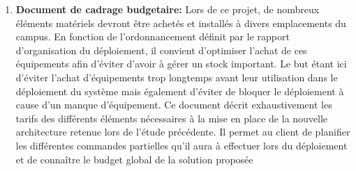 \begin{enumerate}
\item \textbf{Document de cadrage budgetaire:} Lors de ce projet, de nombreux éléments matériels devront être achetés et installés à divers emplacements du campus. En fonction de l'ordonnancement définit par le rapport d'organisation du déploiement, il convient d'optimiser l'achat de ces équipements afin d'éviter d'avoir à gérer un stock important. Le but étant ici d'éviter l'achat d'équipements trop longtemps avant leur utilisation dans le déploiement du système mais également d'éviter de bloquer le déploiement à cause d'un manque d'équipement. Ce document décrit exhaustivement les tarifs des différents éléments nécessaires à la mise en place de la nouvelle architecture retenue lors de l'étude précédente. Il permet au client de planifier les différentes commandes partielles qu'il aura à effectuer lors du déploiement et de connaître le budget global de la solution proposée
\end{enumerate}